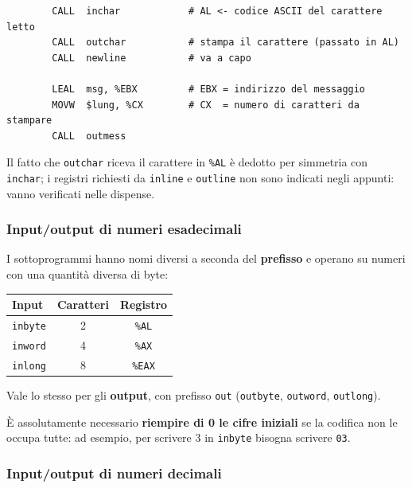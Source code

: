 \documentclass[11pt,a4paper]{article}
\newcommand{\reg}[1]{\texttt{\%#1}}
\begin{document}
\begin{integrazione}
\begin{lstlisting}
        CALL  inchar            # AL <- codice ASCII del carattere letto
        CALL  outchar           # stampa il carattere (passato in AL)
        CALL  newline           # va a capo

        LEAL  msg, %EBX         # EBX = indirizzo del messaggio
        MOVW  $lung, %CX        # CX  = numero di caratteri da stampare
        CALL  outmess
\end{lstlisting}
Il fatto che \texttt{outchar} riceva il carattere in \reg{AL} è dedotto per simmetria con \texttt{inchar}; i registri richiesti da \texttt{inline} e \texttt{outline} non sono indicati negli appunti: vanno verificati nelle dispense.
\end{integrazione}

\subsubsection*{Input/output di numeri esadecimali}

I sottoprogrammi hanno nomi diversi a seconda del \textbf{prefisso} e operano su numeri con una quantità diversa di byte:

\begin{center}
\begin{tabular}{l c c}
\textbf{Input} & \textbf{Caratteri} & \textbf{Registro} \\ \hline
\texttt{inbyte} & 2 & \reg{AL} \\
\texttt{inword} & 4 & \reg{AX} \\
\texttt{inlong} & 8 & \reg{EAX} \\
\end{tabular}
\end{center}

Vale lo stesso per gli \textbf{output}, con prefisso \texttt{out} (\texttt{outbyte}, \texttt{outword}, \texttt{outlong}).

\begin{nota}[Attenzione]
È assolutamente necessario \textbf{riempire di 0 le cifre iniziali} se la codifica non le occupa tutte: ad esempio, per scrivere 3 in \texttt{inbyte} bisogna scrivere \texttt{03}.
\end{nota}

\subsubsection*{Input/output di numeri decimali}
\end{document}
